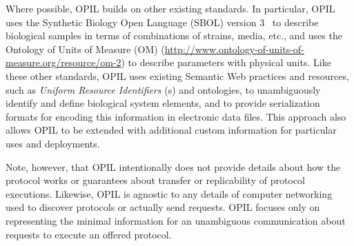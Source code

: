Where possible, OPIL builds on other existing standards.
In particular, OPIL uses the Synthetic Biology Open Language (SBOL) version 3~\citep{SBOL3} to describe biological samples in terms of combinations of strains, media, etc., and uses the Ontology of Units of Measure (OM) (\url{http://www.ontology-of-units-of-measure.org/resource/om-2}) to describe parameters with physical units.
Like these other standards, OPIL uses existing Semantic Web practices and resources, such as \emph{Uniform Resource Identifiers} (s) and ontologies, to unambiguously identify and define biological system elements,
and to provide serialization formats for encoding this information in electronic data files.
This approach also allows OPIL to be extended with additional custom information for particular uses and deployments.

Note, however, that OPIL intentionally does not provide details about how the protocol works or guarantees about transfer or replicability of protocol executions. 
Likewise, OPIL is agnostic to any details of computer networking used to discover protocols or actually send requests.
OPIL focuses only on representing the minimal information for an unambiguous communication about requests to execute an offered protocol.

